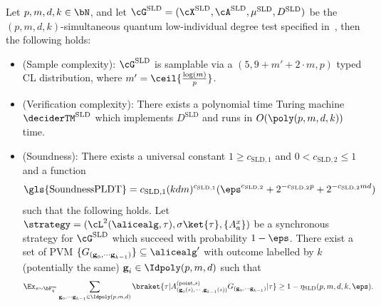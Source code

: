 \begin{lemma}  \label{lem:simuQLID}
	Let $p,m,d,k \in \bN$, and let $\cG^{\text{SLD}} = (\cX^{\text{SLD}}, \cA^{\text{SLD}}, \mu^{\text{SLD}}, D^{\text{SLD}})$ be the $(p,m,d,k)$-simultaneous quantum low-individual degree test specified in~, then the following holds:
	\begin{itemize}
		\item (Sample complexity): $\cG^{\text{SLD}}$ is samplable via a $(5, 9+ m' + 2\cdot m, p)$ typed CL distribution, where $m' = \ceil{\frac{\log(m)}{p}}$. 
		\item (Verification complexity): There exists a polynomial time Turing machine $\deciderTM^{\text{SLD}}$ which implements $D^{\text{SLD}}$ and runs in $O(\poly(p,m,d,k))$ time.
		\item (Soundness): There exists a universal constant $1 \geq c_{\text{SLD},1}$ and $0 < c_{\text{SLD},2} \leq 1$  and a function 
		\begin{equation*}
			\text{\gls{SoundnessPLDT}} =  c_{\text{SLD},1} (kdm)^{c_{\text{SLD},1}} (\eps^{c_{\text{SLD},2}} + 2^{-c_{\text{SLD},2}p} + 2^{-c_{\text{SLD},2}md})
		\end{equation*}
		such that the following holds. Let $\strategy =( \cL^2(\alicealg, \tau), \sigma \ket{\tau},\{ A_{a}^x \} )$ be a synchronous strategy for $\cG^{\text{SLD}}$ which succeed with probability $1- \eps$. There exist a set of PVM $\{G_{(\textbf{g}_0, \cdots \textbf{g}_{k-1})}\} \subseteq \alicealg'$ with outcome labelled by $k$ (potentially the same) $\textbf{g}_i\in \Idpoly(p,m,d)$ such that 
		\begin{align*} 
			&\Ex_{s \sim \bF_{q}^m} \sum_{\textbf{g}_0, \cdots \textbf{g}_{k-1} \in \Idpoly(p,m,d)} \braket{\tau| A^{(\text{point}, s)}_{(\textbf{g}_0(s), \cdots, \textbf{g}_{k-1}(s))} G_{(\textbf{g}_0, \cdots \textbf{g}_{k-1})} |\tau} \geq 1 - \mathbf{\eta}_{\text{SLD}}(p,m,d,k, \eps). 
		\end{align*}
	\end{itemize}
\end{lemma}


